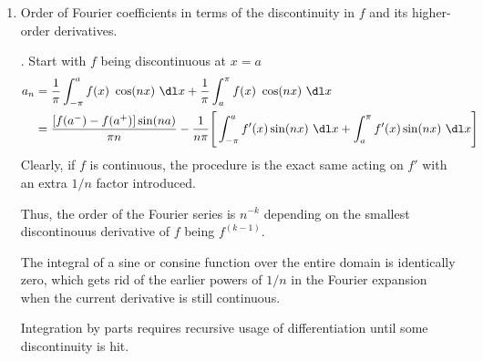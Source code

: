 \begin{enumerate}
    \item Order of Fourier coefficients in terms of the discontinuity in $ f $ and
          its higher-order derivatives. \par.
          Start with $ f $ being discontinuous at $ x = a $
          \begin{align}
              a_n & = \frac{1}{\pi} \int_{-\pi}^{a} f(x)\ \cos(nx)\ \dl x
              + \frac{1}{\pi} \int_{a}^{\pi} f(x)\ \cos(nx)\ \dl x                    \\
                  & = \frac{[f(a^-) - f(a^+)] \sin(na)}{\pi n} - \frac{1}{n\pi}\Bigg[
                  \int_{-\pi}^{a} f'(x) \sin(nx)\ \dl x  + \int_{a}^{\pi}
                  f'(x) \sin(nx)\ \dl x\Bigg]
          \end{align}
          Clearly, if $ f $ is continuous, the procedure is the exact same acting on
          $ f' $ with an extra $ 1/n $ factor introduced. \par
          Thus, the order of the Fourier series is $ n^{-k} $ depending on the smallest
          discontinouus derivative of $ f $ being $ f^{(k-1)} $. \par
          The integral of a sine or consine function over the entire domain is
          identically zero, which gets rid of the earlier powers of $ 1/n $ in the
          Fourier expansion when the current derivative is still continuous. \par
          Integration by parts requires recursive usage of differentiation until
          some discontinuity is hit.
\end{enumerate}